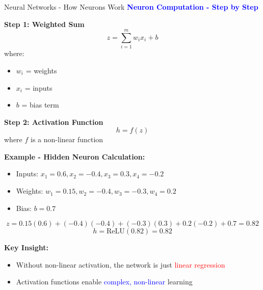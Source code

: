 \documentclass[8pt]{beamer}
\begin{document}
	\begin{frame}{Neural Networks - How Neurons Work}
		\fontsize{6.5}{7.5}\selectfont
		\textcolor{blue}{\textbf{Neuron Computation - Step by Step}}
		
		\textbf{Step 1: Weighted Sum}
		\[
		z = \sum_{i=1}^m w_i x_i + b
		\]
		where:
		\begin{itemize}
			\item $w_i$ = weights
			\item $x_i$ = inputs
			\item $b$ = bias term
		\end{itemize}
		
		\textbf{Step 2: Activation Function}
		\[
		h = f(z)
		\]
		where $f$ is a non-linear function
		
		\textbf{Example - Hidden Neuron Calculation:}
		\begin{itemize}
			\item Inputs: $x_1 = 0.6, x_2 = -0.4, x_3 = 0.3, x_4 = -0.2$
			\item Weights: $w_1 = 0.15, w_2 = -0.4, w_3 = -0.3, w_4 = 0.2$
			\item Bias: $b = 0.7$
		\end{itemize}
		
		\[
		z = 0.15(0.6) + (-0.4)(-0.4) + (-0.3)(0.3) + 0.2(-0.2) + 0.7 = 0.82
		\]
		\[
		h = \text{ReLU}(0.82) = 0.82
		\]
		
		\textbf{Key Insight:}
		\begin{itemize}
			\item Without non-linear activation, the network is just \textcolor{red}{linear regression}
			\item Activation functions enable \textcolor{blue}{complex, non-linear} learning
		\end{itemize}
	\end{frame}
	
\end{document}
